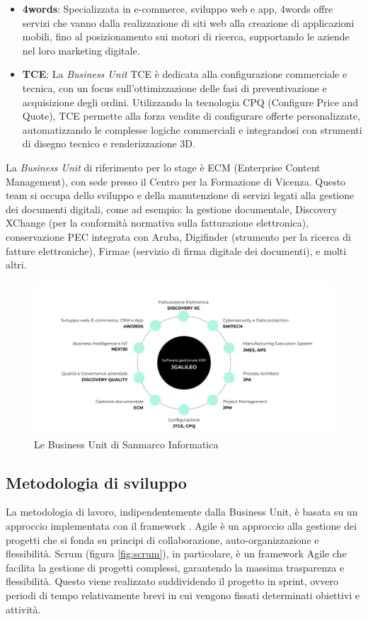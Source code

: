 \begin{itemize}
    \item \textbf{4words}: Specializzata in e-commerce, sviluppo web e app, 4words offre servizi che vanno dalla realizzazione di siti web alla creazione di applicazioni mobili, fino al posizionamento sui motori di ricerca, supportando le aziende nel loro marketing digitale.
    \item \textbf{TCE}: La \emph{Business Unit} TCE è dedicata alla configurazione commerciale e tecnica, con un focus sull'ottimizzazione delle fasi di preventivazione e acquisizione degli ordini. Utilizzando la tecnologia CPQ (Configure Price and Quote), TCE permette alla forza vendite di configurare offerte personalizzate, automatizzando le complesse logiche commerciali e integrandosi con strumenti di disegno tecnico e renderizzazione 3D.
\end{itemize}

La \emph{Business Unit} di riferimento per lo stage è ECM (Enterprise Content Management), con sede presso il Centro per la Formazione di Vicenza. Questo team si occupa dello sviluppo e della manutenzione di servizi legati alla gestione dei documenti digitali, come ad esempio: la gestione documentale, Discovery XChange (per la conformità normativa sulla fatturazione elettronica), conservazione PEC integrata con Aruba, Digifinder (strumento per la ricerca di fatture elettroniche), Firmae (servizio di firma digitale dei documenti), e molti altri.

\begin{figure}[h!]
    \centering
    \includegraphics[width=0.8\columnwidth]{img/business_unit.png}
    \caption{Le Business Unit di Sanmarco Informatica}
    \label{fig:business_unit}
\end{figure}

\subsection{Metodologia di sviluppo}
La metodologia di lavoro, indipendentemente dalla Business Unit, è basata su un approccio  implementata con il framework . Agile è un approccio alla gestione dei progetti che si fonda su principi di collaborazione, auto-organizzazione e flessibilità. Scrum (figura \ref{fig:scrum}), in particolare, è un framework Agile che facilita la gestione di progetti complessi, garantendo la massima trasparenza e flessibilità. Questo viene realizzato suddividendo il progetto in sprint, ovvero periodi di tempo relativamente brevi in cui vengono fissati determinati obiettivi e attività.

